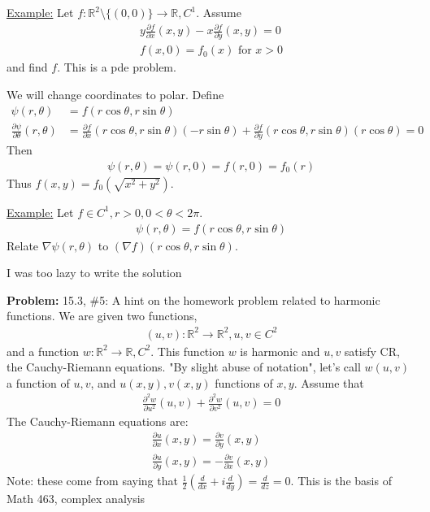 \documentclass{article}
\newcommand*{\txt}[1]{\text{ #1 }}%
\newcommand*{\rr}{\mathbb{R}}%
\begin{document}
\underline{Example:} Let $f:\rr^2\setminus \{(0,0)\}\to \rr, C^1$. Assume \begin{align*}
    y\frac{\partial f}{\partial x}(x,y)-x\frac{\partial f}{\partial y}(x,y)=0\\ 
    f(x,0)=f_0(x)\txt{for}x>0
\end{align*} and find $f$. This is a pde problem. 

We will change coordinates to polar. Define \begin{align*}
    \psi(r,\theta)&=f(r\cos\theta,r\sin\theta)\\
    \frac{\partial \psi}{\partial \theta}(r,\theta)&=\frac{\partial f}{\partial x}(r\cos\theta,r\sin\theta)(-r\sin\theta)+\frac{\partial f}{\partial y}(r\cos\theta,r\sin\theta)(r\cos\theta)=0
\end{align*} Then \begin{align*}
    \psi(r,\theta)=\psi(r,0)=f(r,0)=f_0(r)
\end{align*} Thus $f(x,y)=f_0(\sqrt{x^2+y^2})$.

\underline{Example:} Let $f\in C^1, r>0,0<\theta<2\pi$. \begin{align*}
    \psi(r,\theta)=f(r\cos\theta,r\sin\theta)
\end{align*} Relate $\nabla\psi(r,\theta)$ to $(\nabla f)(r\cos\theta,r\sin\theta)$. 

I was too lazy to write the solution

\textbf{Problem:} 15.3, \#5: A hint on the homework problem related to harmonic functions. We are given two functions, \begin{align*}
    (u,v):\rr^2\to \rr^2, u,v\in C^2
\end{align*} and a function $w:\rr^2\to \rr, C^2$. This function $w$ is harmonic and $u,v$ satisfy CR, the Cauchy-Riemann equations. "By slight abuse of notation", let's call $w(u,v)$ a function of $u,v$, and $u(x,y),v(x,y)$ functions of $x,y$. Assume that \begin{align*}
    \frac{\partial^2 w}{\partial u^2}(u,v)+\frac{\partial^2 w}{\partial v^2}(u,v)=0
\end{align*} The Cauchy-Riemann equations are:\begin{align*}
    \frac{\partial u}{\partial x}(x,y)=\frac{\partial v}{\partial y}(x,y)\\
    \frac{\partial u}{\partial y}(x,y)=-\frac{\partial v}{\partial x}(x,y)
\end{align*} Note: these come from saying that $\frac{1}{2}(\frac{d}{dx}+i\frac{d}{dy})=\frac{d}{dz}=0$. This is the basis of Math 463, complex analysis
\end{document}
